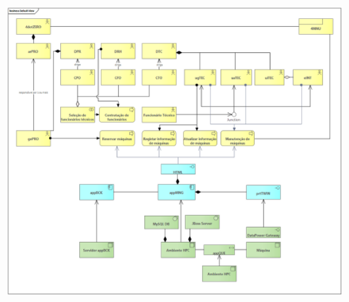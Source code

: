 \documentclass{article}
\begin{document}
    \begin{figure}[H]
        \centering
        \vspace*{1.8cm}
        \includegraphics[angle=-90,origin=c,width=\textwidth,height=\textheight,keepaspectratio]{ArchiMate.png}
    \end{figure}
\end{document}
